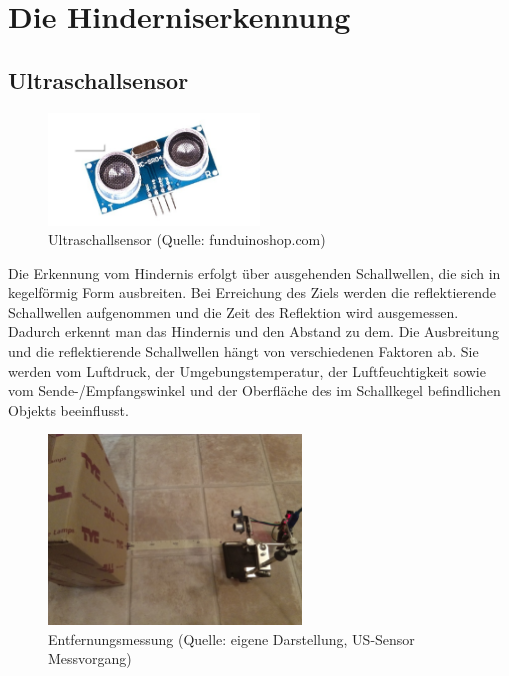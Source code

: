 \newpage
\renewcommand{\autoren}{Valentyn Chepil}

\section{Die Hinderniserkennung}
\subsection{Ultraschallsensor}

\begin{figure}[!h]  %
	\centering\includegraphics[width=0.5\textwidth]{images/Bild-1-1.png}
	\caption{Ultraschallsensor \newline(Quelle: funduinoshop.com)}
	\label{bild_1.1} %
\end{figure}

Die Erkennung vom Hindernis erfolgt über ausgehenden Schallwellen, die sich in kegelförmig Form  ausbreiten. Bei Erreichung des Ziels werden die reflektierende Schallwellen aufgenommen und die Zeit des Reflektion wird ausgemessen. Dadurch erkennt man das Hindernis und den Abstand zu dem. Die Ausbreitung und die reflektierende Schallwellen hängt von verschiedenen Faktoren ab. Sie werden vom Luftdruck, der Umgebungstemperatur, der Luftfeuchtigkeit sowie vom Sende-/Empfangswinkel und der Oberfläche des im Schallkegel befindlichen Objekts beeinflusst.


\begin{figure}[!h]  %
	\centering\includegraphics[width=0.6\textwidth]{images/Bild-1.jpg}
	\caption{Entfernungsmessung \newline (Quelle: eigene Darstellung, US-Sensor Messvorgang)}
	\label{bild_1} %
\end{figure}

